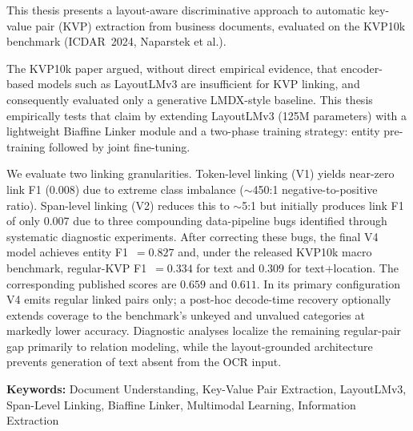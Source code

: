 This thesis presents a layout-aware discriminative approach to automatic
key-value pair (KVP) extraction from business documents, evaluated on the
KVP10k benchmark (ICDAR~2024, Naparstek et al.).

The KVP10k paper argued, without direct empirical evidence, that
encoder-based models such as LayoutLMv3 are insufficient for KVP linking,
and consequently evaluated only a generative LMDX-style baseline.
This thesis empirically tests that claim by extending LayoutLMv3
(125M parameters) with a lightweight Biaffine Linker module and a two-phase
training strategy: entity pre-training followed by joint fine-tuning.

We evaluate two linking granularities. Token-level linking (V1) yields
near-zero link F1 (0.008) due to extreme class imbalance ($\sim$450:1
negative-to-positive ratio). Span-level linking (V2) reduces this to
$\sim$5:1 but initially produces link F1 of only 0.007 due to three
compounding data-pipeline bugs identified through systematic diagnostic
experiments. After correcting these bugs, the final V4 model achieves
entity F1~$=0.827$ and, under the released KVP10k macro benchmark, regular-KVP
F1~$=0.334$ for text and $0.309$ for text+location. The corresponding
published scores are $0.659$ and $0.611$. In its primary configuration V4 emits
regular linked pairs only; a post-hoc decode-time recovery optionally extends
coverage to the benchmark's unkeyed and unvalued categories at markedly lower
accuracy.
Diagnostic analyses localize the remaining regular-pair gap primarily to
relation modeling, while the layout-grounded architecture prevents generation
of text absent from the OCR input.

\textbf{Keywords:} Document Understanding, Key-Value Pair Extraction,
LayoutLMv3, Span-Level Linking, Biaffine Linker, Multimodal Learning,
Information Extraction
